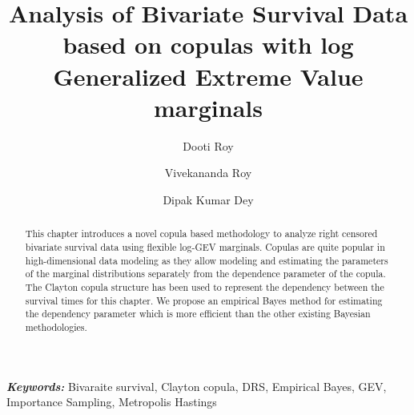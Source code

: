 \documentclass[11pt]{article}
\title{Analysis of Bivariate Survival Data based on copulas with log Generalized Extreme Value marginals}
\author[*]{Dooti Roy}
\author[**]{ Vivekananda Roy}
\author[*]{Dipak Kumar Dey}
\affil[*]{University of Connecticut, Storrs, CT, USA}
\affil[**]{Iowa State University, Ames, Iowa, USA}
\theoremstyle{remboldstyle}
\begin{document}
\providecommand{\keywords}[1]{\textbf{\textit{Keywords: }} #1}
\maketitle
\begin{abstract}
\noindent
This chapter introduces a novel copula based methodology to analyze right censored bivariate survival data using flexible log-GEV marginals. Copulas are quite popular in high-dimensional data modeling as they allow modeling and estimating the parameters of the marginal distributions separately from the dependence parameter of the copula. The Clayton copula structure has been used to represent the dependency between the survival times for this chapter. We propose an empirical Bayes method for estimating the dependency parameter which is more efficient than the other existing Bayesian methodologies. 
\end{abstract}
\keywords{Bivaraite survival, Clayton copula, DRS, Empirical Bayes, GEV, Importance Sampling, Metropolis Hastings}
\end{document}
